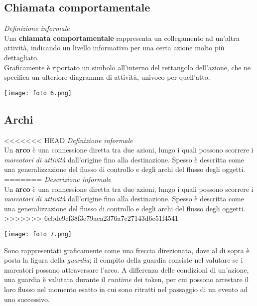 \documentclass{article}
\begin{document}
\subsection*{Chiamata comportamentale}
\large
\textit{Definizione informale}\\Una \textbf{chiamata comportamentale} rappresenta un collegamento ad un'altra attività, indicando un livello informativo per una certa azione molto più dettagliato.\vspace*{14pt}\\
Graficamente è riportato un simbolo all'interno del rettangolo dell'azione, che ne specifica un ulteriore diagramma di attività, univoco per quell'atto.\\
\begin{center}
    \texttt{[image: foto 6.png]}
\end{center}

\subsection*{Archi}
\large
<<<<<<< HEAD
\textit{Definizione informale}\\Un \textbf{arco} è una connessione diretta tra due azioni, lungo i quali possono scorrere i \textit{marcatori di attività} dall'origine fino alla destinazione. Spesso è descritta come una generalizzazione del flusso di controllo e degli archi del flusso degli oggetti.\\
=======
\textit{Descrizione informale}\\Un \textbf{arco} è una connessione diretta tra due azioni, lungo i quali possono scorrere i \textit{marcatori di attività} dall'origine fino alla destinazione. Spesso è descritta come una generalizzazione del flusso di controllo e degli archi del flusso degli oggetti.\\
>>>>>>> 6ebde9cf38f3c79aea2376a7c27143d6c51f4541
\begin{center}
    \texttt{[image: foto 7.png]}
\end{center}
Sono rappresentati graficamente come una freccia direzionata, dove al di sopra è posta la figura della \textit{guardia}; il compito della guardia consiste nel valutare se i marcatori possano attraversare l'arco. A differenza delle condizioni di un'azione, una guardia è valutata durante il \textit{runtime} dei token, per cui possono arrestare il loro flusso nel momento esatto in cui sono ritratti nel passaggio di un evento ad uno successivo.
\end{document}

